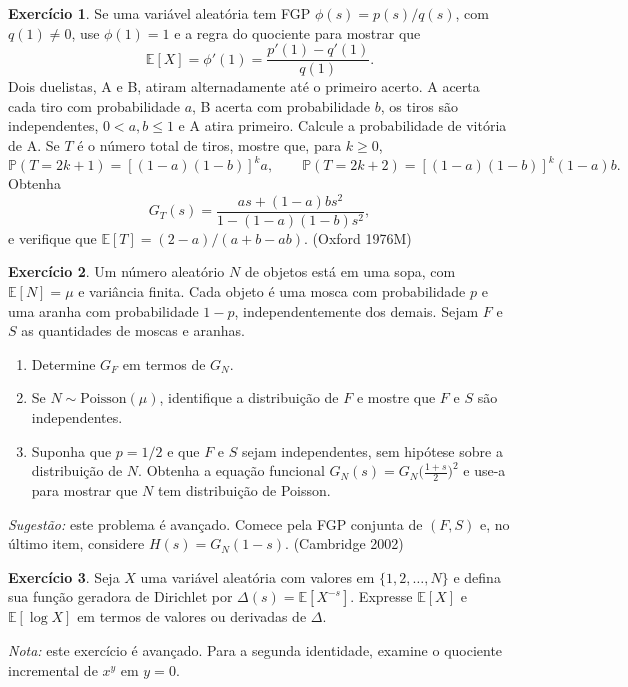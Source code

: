 \documentclass[12pt,portuguese]{article}
\theoremstyle{definition}
\theoremstyle{plainexercise}
\newtheorem{exercise}{Exercício}
\theoremstyle{starredexercise}
\theoremstyle{definition}
\begin{document}
\begin{exercise}\label{exercise:gw-prob-10}
Se uma variável aleatória tem FGP $\phi(s)=p(s)/q(s)$, com $q(1)\neq0$,
use $\phi(1)=1$ e a regra do quociente para mostrar que
\[
\mathbb{E}[X]=\phi'(1)=\frac{p'(1)-q'(1)}{q(1)}.
\]
Dois duelistas, A e B, atiram alternadamente até o primeiro acerto. A acerta
cada tiro com probabilidade $a$, B acerta com probabilidade $b$, os tiros são
independentes, $0<a,b\leqslant1$ e A atira primeiro. Calcule a probabilidade
de vitória de A.
Se $T$ é o número total de tiros, mostre que, para $k\geqslant0$,
\[
\mathbb{P}(T=2k+1)=[(1-a)(1-b)]^k a,
\qquad
\mathbb{P}(T=2k+2)=[(1-a)(1-b)]^k(1-a)b.
\]
Obtenha
\[
G_T(s)=\frac{as+(1-a)bs^2}{1-(1-a)(1-b)s^2},
\]
e verifique que
$\mathbb{E}[T]=(2-a)/(a+b-ab)$. (Oxford 1976M)
\end{exercise}

\begin{exercise}\label{exercise:gw-prob-11}
Um número aleatório $N$ de objetos está em uma sopa, com
$\mathbb{E}[N]=\mu$ e variância finita. Cada objeto é uma mosca com
probabilidade $p$ e uma aranha com probabilidade $1-p$, independentemente dos
demais. Sejam $F$ e $S$ as quantidades de moscas e aranhas.
\begin{enumerate}[label=(\alph*)]
\item Determine $G_F$ em termos de $G_N$.
\item Se $N\sim\mathrm{Poisson}(\mu)$, identifique a distribuição de $F$ e
mostre que $F$ e $S$ são independentes.
\item Suponha que $p=1/2$ e que $F$ e $S$ sejam independentes, sem hipótese
sobre a distribuição de $N$. Obtenha a equação funcional
$G_N(s)=G_N\bigl(\tfrac{1+s}{2}\bigr)^2$ e use-a para mostrar que $N$ tem
distribuição de Poisson.
\end{enumerate}
\emph{Sugestão:} este problema é avançado. Comece pela FGP conjunta de
$(F,S)$ e, no último item, considere $H(s)=G_N(1-s)$.
(Cambridge 2002)
\end{exercise}

\begin{exercise}\label{exercise:gw-4-32}
Seja $X$ uma variável aleatória com valores em $\{1,2,\ldots,N\}$ e defina sua
função geradora de Dirichlet por $\Delta(s)=\mathbb{E}[X^{-s}]$. Expresse
$\mathbb{E}[X]$ e $\mathbb{E}[\log X]$ em termos de valores ou derivadas de
$\Delta$.

\emph{Nota:} este exercício é avançado. Para a segunda identidade, examine o
quociente incremental de $x^y$ em $y=0$.
\end{exercise}



\end{document}
